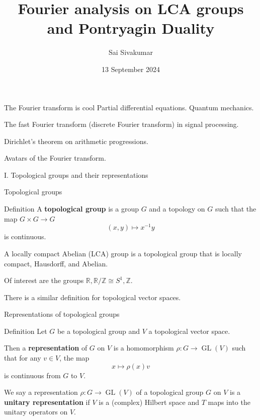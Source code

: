 \documentclass[mathserif
, handout
]{beamer}
\title
{\textcolor{black!85}{Fourier analysis on LCA groups and Pontryagin Duality}}
\author[Sai Sivakumar]{Sai Sivakumar}
\date{13 September 2024}
\DeclareMathOperator{\GL}{GL}
\begin{document}
\frame{\titlepage}

\begin{frame}{The Fourier transform is cool}
    Partial differential equations. Quantum mechanics. %
    \pause

    The fast Fourier transform (discrete Fourier transform) in signal processing. %
    \pause

    Dirichlet's theorem on arithmetic progressions.
    \pause

    Avatars of the Fourier transform.
\end{frame}

\begin{frame}{}
    \begin{block}{}{
        \begin{center}\Large I. Topological groups and their representations\end{center}}
    \end{block}
\end{frame}

\begin{frame}{Topological groups}
    \begin{block}{Definition}
        A \textbf{topological group} is a group $G$ and a topology on $G$ such that the map $G\times G\to G$ \[(x,y)\mapsto x^{-1}y\] is continuous.
    \end{block} 
    \pause

    A locally compact Abelian (LCA) group is a topological group that is locally compact, Hausdorff, and Abelian.
    \pause

    Of interest are the groups $\mathbb{R}, \mathbb{R}/\mathbb{Z}\cong S^1, \mathbb{Z}$.
    \pause

    There is a similar definition for topological vector spaces.
\end{frame}

\begin{frame}{Representations of topological groups}
    \begin{block}{Definition}
        Let $G$ be a topological group and $V$ a topological vector space.
        
        Then a \textbf{representation} of $G$ on $V$ is a %
        homomorphism $\rho\colon G\to \GL(V)$ such that for any $v\in V$, the map \[x\mapsto \rho(x)v\] is continuous from $G$ to $V$. %
    \end{block} 
    \pause

    We say a representation $\rho\colon G\to \GL(V)$ of a topological group $G$ on $V$ is a \textbf{unitary representation} if $V$ is a (complex) Hilbert space and $T$ maps into the unitary operators on $V$. %
\end{frame}
\end{document}
